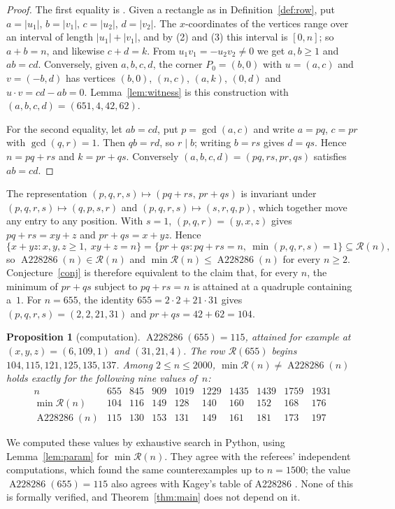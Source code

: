 \documentclass[11pt]{amsart}
\theoremstyle{plain}
\newtheorem{proposition}[theorem]{Proposition}
\theoremstyle{definition}
\newcommand{\R}{\mathcal{R}}
\newcommand{\Aa}{\operatorname{A228286}}
\begin{document}
\begin{proof}
The first equality is . Given a rectangle as in Definition~\ref{def:row}, put $a=|u_1|$, $b=|v_1|$, $c=|u_2|$, $d=|v_2|$. The $x$-coordinates of the vertices range over an interval of length $|u_1|+|v_1|$, and by (2) and (3) this interval is $[0,n]$; so $a+b=n$, and likewise $c+d=k$. From $u_1v_1=-u_2v_2\ne0$ we get $a,b\ge1$ and $ab=cd$. Conversely, given $a,b,c,d$, the corner $P_0=(b,0)$ with $u=(a,c)$ and $v=(-b,d)$ has vertices $(b,0)$, $(n,c)$, $(a,k)$, $(0,d)$ and $u\cdot v=cd-ab=0$. Lemma~\ref{lem:witness} is this construction with $(a,b,c,d)=(651,4,42,62)$.

For the second equality, let $ab=cd$, put $p=\gcd(a,c)$ and write $a=pq$, $c=pr$ with $\gcd(q,r)=1$. Then $qb=rd$, so $r\mid b$; writing $b=rs$ gives $d=qs$. Hence $n=pq+rs$ and $k=pr+qs$. Conversely $(a,b,c,d)=(pq,rs,pr,qs)$ satisfies $ab=cd$.
\end{proof}

The representation $(p,q,r,s)\mapsto(pq+rs,\,pr+qs)$ is invariant under $(p,q,r,s)\mapsto(q,p,s,r)$ and $(p,q,r,s)\mapsto(s,r,q,p)$, which together move any entry to any position. With $s=1$, $(p,q,r)=(y,x,z)$ gives $pq+rs=xy+z$ and $pr+qs=x+yz$. Hence
\[
  \{x+yz:x,y,z\ge1,\ xy+z=n\}=\{pr+qs:pq+rs=n,\ \min(p,q,r,s)=1\}\subseteq\R(n),
\]
so $\Aa(n)\in\R(n)$ and $\min\R(n)\le\Aa(n)$ for every $n\ge2$. Conjecture~\ref{conj} is therefore equivalent to the claim that, for every $n$, the minimum of $pr+qs$ subject to $pq+rs=n$ is attained at a quadruple containing a~$1$. For $n=655$, the identity $655=2\cdot2+21\cdot31$ gives $(p,q,r,s)=(2,2,21,31)$ and $pr+qs=42+62=104$.

\begin{proposition}[computation]\label{prop:comp}
$\Aa(655)=115$, attained for example at $(x,y,z)=(6,109,1)$ and $(31,21,4)$. The row $\R(655)$ begins $104,115,121,125,135,137$. Among $2\le n\le2000$, $\min\R(n)\ne\Aa(n)$ holds exactly for the following nine values of~$n$:
\[
\begin{array}{c|ccccccccc}
  n & 655 & 845 & 909 & 1019 & 1229 & 1435 & 1439 & 1759 & 1931\\ \hline
  \min\R(n) & 104 & 116 & 149 & 128 & 140 & 160 & 152 & 168 & 176\\
  \Aa(n) & 115 & 130 & 153 & 131 & 149 & 161 & 181 & 173 & 197
\end{array}
\]
\end{proposition}

We computed these values by exhaustive search in Python, using Lemma~\ref{lem:param} for $\min\R(n)$. They agree with the referees' independent computations, which found the same counterexamples up to $n=1500$; the value $\Aa(655)=115$ also agrees with Kagey's table of A228286 \cite{A228286}. None of this is formally verified, and Theorem~\ref{thm:main} does not depend on it.
\end{document}
